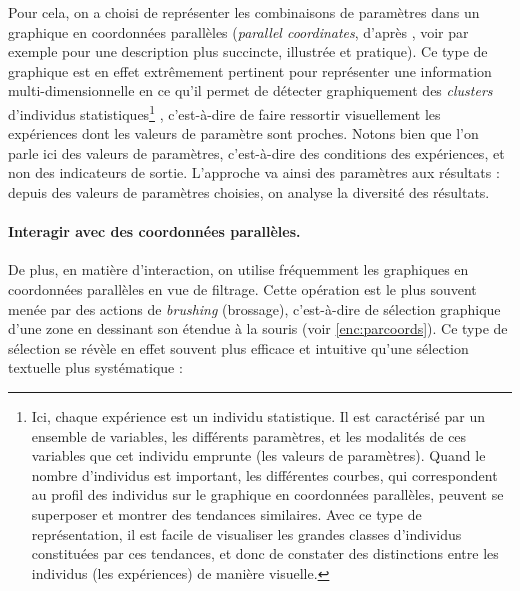 Pour cela, on a choisi de représenter les combinaisons de paramètres dans un graphique en \og coordonnées parallèles \fg{} (\textit{parallel coordinates}, d'après \cite{inselberg_parallel_1987}, voir \cite{few_multivariate_2006} par exemple pour une description plus succincte, illustrée et pratique).
Ce type de graphique est en effet extrêmement pertinent pour représenter une information multi-dimensionnelle en ce qu'il permet de détecter graphiquement des \textit{clusters} d'individus statistiques\footnote{
	Ici, chaque expérience est un individu statistique.
	Il est caractérisé par un ensemble de variables, les différents paramètres, et les modalités de ces variables que cet individu emprunte (les valeurs de paramètres).
	Quand le nombre d'individus est important, les différentes \og courbes\fg{}, qui correspondent au profil des individus sur le graphique en coordonnées parallèles, peuvent se superposer et montrer des tendances similaires.
	Avec ce type de représentation, il est facile de visualiser les grandes classes d'individus constituées par ces \og tendances\fg{}, et donc de constater des distinctions entre les individus (les expériences) de manière visuelle.
} \autocite[2]{heinrich_state_2013}, c'est-à-dire de faire ressortir visuellement les expériences dont les valeurs de paramètre sont proches.
Notons bien que l'on parle ici des valeurs de paramètres, c'est-à-dire des conditions des expériences, et non des indicateurs de sortie.
L'approche va ainsi des paramètres aux résultats : depuis des valeurs de paramètres choisies, on analyse la diversité des résultats.


\paragraph{Interagir avec des coordonnées parallèles.}
De plus, en matière d'interaction, on utilise fréquemment les graphiques en coordonnées parallèles en vue de filtrage.
Cette opération est le plus souvent menée par des actions de \textit{brushing} (\og brossage\fg{}), c'est-à-dire de sélection graphique d'une zone en dessinant son étendue à la souris (voir \cref{enc:parcoords}).
Ce type de sélection se révèle en effet souvent plus efficace et intuitive qu'une sélection textuelle plus systématique :


